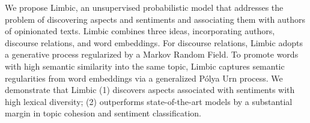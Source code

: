 We propose Limbic, an unsupervised probabilistic model that addresses the problem of discovering aspects and sentiments and associating them with authors of opinionated texts. Limbic combines three ideas, incorporating authors, discourse relations, and word embeddings. For discourse relations, Limbic adopts a generative process regularized by a Markov Random Field. To promote words with high semantic similarity into the same topic, Limbic captures semantic regularities from word embeddings via a generalized Pólya Urn process. We demonstrate that Limbic (1) discovers aspects associated with sentiments with high lexical diversity; (2) outperforms state-of-the-art models by a substantial margin in topic cohesion and sentiment classification.
